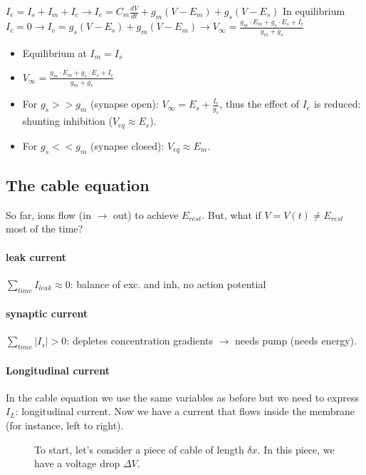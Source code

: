 \documentclass[main]{subfiles}
\begin{document}
$I_e = I_s + I_m + I_c \rightarrow I_e = C_m \frac{dV}{dt} + g_m (V - E_m) + g_s(V - E_s)$
In equilibrium $I_c = 0 \rightarrow I_e = g_s(V - E_s) + g_m (V - E_m) \rightarrow V_\infty = \frac{g_m \cdot E_m + g_s \cdot E_s + I_e}{g_m+g_s}$

\begin{itemize}[noitemsep,nolistsep]
	\item Equilibrium at $I_m=I_s$
	\item $V_\infty = \frac{g_m \cdot E_m + g_s \cdot E_s + I_e}{g_m+g_s}$
	\item For $g_s >> g_m$ (synapse open): $V_\infty = E_s + \frac{I_e}{g_s}$, thus the effect of $I_e$ is reduced: shunting inhibition ($V_{eq} \approx E_s$).
	\item For $g_s << g_m$ (synapse closed): $V_{eq} \approx E_m$.
\end{itemize}

\subsection{The cable equation}

So far, ions flow (in $\rightarrow$ out) to achieve $E_{rest}$. But, what if $V = V(t) \neq E_{rest}$ most of the time?

\paragraph{leak current}
$\sum_{time} I_{leak} \approx 0$: balance of exc. and inh, no action potential
\paragraph{synaptic current}
$\sum_{time} |I_s| > 0$: depletes concentration gradients $\rightarrow$ needs pump (needs energy).

\paragraph{Longitudinal current}

In the cable equation we use the same variables as before but we need to express $I_L$: longitudinal current. Now we have a current that flows inside the membrane (for instance, left to right).

\begin{figure}[H]
	\centering
	\caption{To start, let's consider a piece of cable of length $\delta x$. In this piece, we have a voltage drop $\Delta V$.}
\end{figure}
\end{document}

